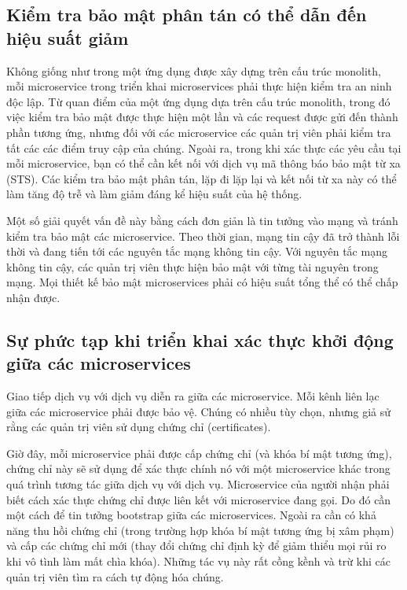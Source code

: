 \documentclass[14pt,a4paper]{book}
\begin{document}
		\subsection{Kiểm tra bảo mật phân tán có thể dẫn đến hiệu suất giảm}
				{\hspace{0.6cm}Không giống như trong một ứng dụng được xây dựng trên cấu trúc monolith, mỗi microservice trong triển khai microservices phải thực hiện kiểm tra an ninh độc lập. Từ quan điểm của một ứng dụng dựa trên cấu trúc monolith, trong đó việc kiểm tra bảo mật được thực hiện một lần và các request được gửi đến thành phần tương ứng, nhưng đối với các microservice các quản trị viên phải kiểm tra tất các các điểm truy cập của chúng. Ngoài ra, trong khi xác thực các yêu cầu tại mỗi microservice, bạn có thể cần kết nối với dịch vụ mã thông báo bảo mật từ xa (STS). Các kiểm tra bảo mật phân tán, lặp đi lặp lại và kết nối từ xa này có thể làm tăng độ trễ và làm giảm đáng kể hiệu suất của hệ thống.\\}
				
				Một số giải quyết vấn đề này bằng cách đơn giản là tin tưởng vào mạng và tránh kiểm tra bảo mật các microservice. Theo thời gian, mạng tin cậy đã trở thành lỗi thời và đang tiến tới các nguyên tắc mạng không tin cậy. Với nguyên tắc mạng không tin cậy, các quản trị viên thực hiện bảo mật với từng tài nguyên trong mạng. Mọi thiết kế bảo mật microservices phải có hiệu suất tổng thể có thể chấp nhận được.
		\subsection{Sự phức tạp khi triển khai xác thực khởi động giữa các	microservices}
				{\hspace{0.6cm}Giao tiếp dịch vụ với dịch vụ diễn ra giữa các microservice. Mỗi kênh liên lạc giữa các microservice phải được bảo vệ. Chúng có nhiều tùy chọn, nhưng giả sử rằng các quản trị viên sử dụng chứng chỉ (certificates).\\}
				
				Giờ đây, mỗi microservice phải được cấp chứng chỉ (và khóa bí mật tương ứng), chứng chỉ này sẽ sử dụng để xác thực chính nó với một microservice khác trong quá trình tương tác giữa dịch vụ với dịch vụ. Microservice của người nhận phải biết cách xác thực chứng chỉ được liên kết với microservice đang gọi. Do đó cần một cách để tin tưởng bootstrap giữa các microservices. Ngoài ra cần có khả năng thu hồi chứng chỉ (trong trường hợp khóa bí mật tương ứng bị xâm phạm) và cấp các chứng chỉ mới (thay đổi chứng chỉ định kỳ để giảm thiểu mọi rủi ro khi vô tình làm mất chìa khóa). Những tác vụ này rất cồng kềnh và trừ khi các quản trị viên tìm ra cách tự động hóa chúng.\\
\end{document}
